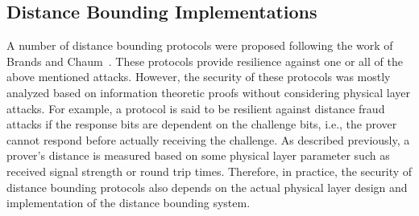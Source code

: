 \documentclass{sig-alternate-10pt}
\newcommand{\ie}{i.e.,\xspace}
\begin{document}
\subsection{Distance Bounding Implementations}
\label{sec:compare-db-implementations}

A number of distance bounding protocols were proposed following the work of
Brands and Chaum~\cite{BrandsMay93}. These protocols provide resilience against
one or all of the above mentioned attacks. However, the security of these
protocols was mostly analyzed based on information theoretic proofs without
considering physical layer attacks. For example, a protocol is said to be
resilient against distance fraud attacks if the response bits are dependent on
the challenge bits, \ie the prover cannot respond before actually receiving the
challenge. As described previously, a prover's distance is measured based on
some physical layer parameter such as received signal strength or round trip
times. Therefore, in practice, the security of distance bounding protocols also
depends on the actual physical layer design and implementation of the distance
bounding system.
\end{document}
